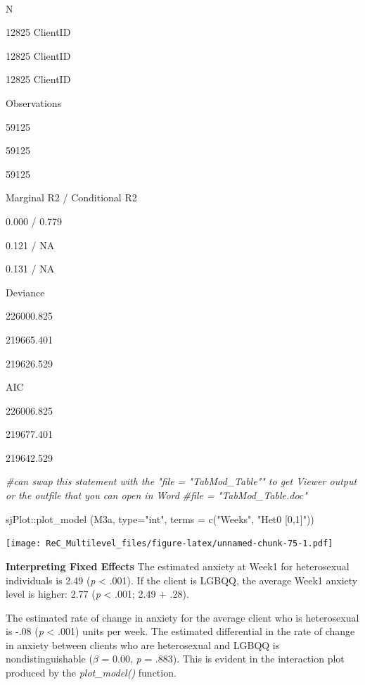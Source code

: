 \documentclass[
  english,
]{book}
\newenvironment{Shaded}{\begin{snugshade}}{\end{snugshade}}
\newcommand{\AttributeTok}[1]{\textcolor[rgb]{0.77,0.63,0.00}{#1}}
\newcommand{\CommentTok}[1]{\textcolor[rgb]{0.56,0.35,0.01}{\textit{#1}}}
\newcommand{\FunctionTok}[1]{\textcolor[rgb]{0.00,0.00,0.00}{#1}}
\newcommand{\NormalTok}[1]{#1}
\newcommand{\SpecialCharTok}[1]{\textcolor[rgb]{0.00,0.00,0.00}{#1}}
\newcommand{\StringTok}[1]{\textcolor[rgb]{0.31,0.60,0.02}{#1}}
\begin{document}
~

N

12825 ClientID

12825 ClientID

12825 ClientID

Observations

59125

59125

59125

Marginal R2 / Conditional R2

0.000 / 0.779

0.121 / NA

0.131 / NA

Deviance

226000.825

219665.401

219626.529

AIC

226006.825

219677.401

219642.529

\begin{Shaded}
\begin{Highlighting}[]
\CommentTok{\#can swap this statement with the "file = "TabMod\_Table"" to get Viewer output or the outfile that you can open in Word}
\CommentTok{\#file = "TabMod\_Table.doc"}
\end{Highlighting}
\end{Shaded}

\begin{Shaded}
\begin{Highlighting}[]
\NormalTok{sjPlot}\SpecialCharTok{::}\FunctionTok{plot\_model}\NormalTok{ (M3a, }\AttributeTok{type=}\StringTok{"int"}\NormalTok{, }\AttributeTok{terms =} \FunctionTok{c}\NormalTok{(}\StringTok{"Weeks"}\NormalTok{, }\StringTok{"Het0 [0,1]"}\NormalTok{))}
\end{Highlighting}
\end{Shaded}

\texttt{[image: ReC\_Multilevel\_files/figure-latex/unnamed-chunk-75-1.pdf]}

\textbf{Interpreting Fixed Effects}
The estimated anxiety at Week1 for heterosexual individuals is 2.49 (\emph{p} \textless{} .001). If the client is LGBQQ, the average Week1 anxiety level is higher: 2.77 (\emph{p} \textless{} .001; 2.49 + .28).

The estimated rate of change in anxiety for the average client who is heterosexual is -.08 (\emph{p} \textless{} .001) units per week. The estimated differential in the rate of change in anxiety between clients who are heterosexual and LGBQQ is nondistinguishable (\(\beta\) = 0.00, \emph{p} = .883). This is evident in the interaction plot produced by the \emph{plot\_model()} function.
\end{document}
